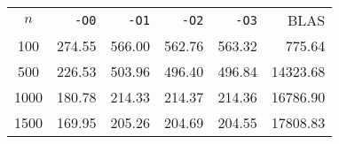 \begin{center}
  \bgroup{}
  \begin{tabular}{c|rrrr|r}
    \hline
    $n$ & \texttt{-O0} & \texttt{-O1} & \texttt{-O2} & \texttt{-O3} & BLAS \\
    \hhline{======}
    100 & 274.55 & 566.00 & 562.76 & 563.32 & 775.64 \\
    500 & 226.53 & 503.96 & 496.40 & 496.84 & 14323.68 \\
    1000 & 180.78 & 214.33 & 214.37 & 214.36 & 16786.90 \\
    1500 & 169.95 & 205.26 & 204.69 & 204.55 & 17808.83 \\
    \hline
  \end{tabular}
  \egroup
\end{center}

